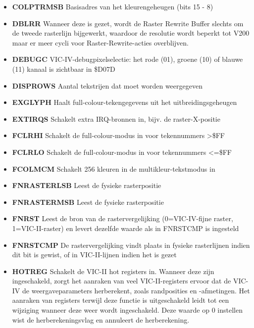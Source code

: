 \begin{itemize}
\item{\bf{COLPTRMSB}} Basisadres van het kleurengeheugen (bits 15 - 8)
\item{\bf{DBLRR}} Wanneer deze is gezet, wordt de Raster Rewrite Buffer slechts om de tweede rasterlijn bijgewerkt, waardoor de resolutie wordt beperkt tot V200 maar er meer cycli voor Raster-Rewrite-acties overblijven.
\item{\bf{DEBUGC}} VIC-IV-debugpixelselectie: het rode (01), groene (10) of blauwe (11) kanaal is zichtbaar in \$D07D
\item{\bf{DISPROWS}} Aantal tekstrijen dat moet worden weergegeven
\item{\bf{EXGLYPH}} Haalt full-colour-tekengegevens uit het uitbreidingsgeheugen
\item{\bf{EXTIRQS}} Schakelt extra IRQ-bronnen in, bijv. de raster-X-positie
\item{\bf{FCLRHI}} Schakelt de full-colour-modus in voor tekennummers >\$FF
\item{\bf{FCLRLO}} Schakelt de full-colour-modus in voor tekennummers <=\$FF
\item{\bf{FCOLMCM}} Schakelt 256 kleuren in de multikleur-tekstmodus in
\item{\bf{FNRASTERLSB}} Leest de fysieke rasterpositie
\item{\bf{FNRASTERMSB}} Leest de fysieke rasterpositie
\item{\bf{FNRST}} Leest de bron van de rastervergelijking (0=VIC-IV-fijne raster, 1=VIC-II-raster) en levert dezelfde waarde als in FNRSTCMP is ingesteld
\item{\bf{FNRSTCMP}} De rastervergelijking vindt plaats in fysieke rasterlijnen indien dit bit is gewist, of in VIC-II-lijnen indien het is gezet
\item{\bf{HOTREG}} Schakelt de VIC-II hot registers in. Wanneer deze zijn ingeschakeld, zorgt het aanraken van veel VIC-II-registers ervoor dat de VIC-IV de weergaveparameters herberekent, zoals randposities en -afmetingen. Het aanraken van registers terwijl deze functie is uitgeschakeld leidt tot een wijziging wanneer deze weer wordt ingeschakeld. Deze waarde op 0 instellen wist de herberekeningsvlag en annuleert de herberekening.

\end{itemize}
